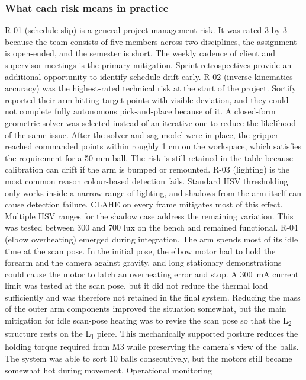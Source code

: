 \subsubsection*{What each risk means in practice}
R-01 (schedule slip) is a general project-management risk. It was rated
3 by 3 because the team consists of five members across two disciplines,
the assignment is open-ended, and the semester is short. The weekly
cadence of client and supervisor meetings is the primary mitigation.
Sprint retrospectives provide an additional opportunity to identify
schedule drift early.
R-02 (inverse kinematics accuracy) was the highest-rated technical
risk at the start of the project. Sortify \cite{sortify} reported their
arm hitting target points with visible deviation, and they could not
complete fully autonomous pick-and-place because of it. A closed-form
geometric solver was selected instead of an iterative one to reduce the
likelihood of the same issue. After the solver and sag model were in
place, the gripper reached commanded points within roughly 1 cm on the
workspace, which satisfies the requirement for a 50 mm ball. The risk is
still retained in the table because calibration can drift if the arm is
bumped or remounted.
R-03 (lighting) is the most common reason colour-based detection
fails. Standard HSV thresholding only works inside a narrow range of
lighting, and shadows from the arm itself can cause detection failure.
CLAHE on every frame mitigates most of this effect. Multiple HSV ranges
for the shadow case address the remaining variation. This was tested
between 300 and 700 lux on the bench and remained functional.
R-04 (elbow overheating) emerged during integration. The arm spends most
of its idle time at the scan pose. In the initial pose, the elbow motor
had to hold the forearm and the camera against gravity, and long
stationary demonstrations could cause the motor to latch an overheating
error and stop. A 300~mA current limit was tested at the scan pose, but
it did not reduce the thermal load sufficiently and was therefore not
retained in the final system.
Reducing the mass of the outer arm components improved the situation
somewhat, but the main mitigation for idle scan-pose heating was to
revise the scan pose so that the L\textsubscript{2} structure rests on
the L\textsubscript{1} piece. This mechanically supported posture reduces
the holding torque required from M3 while preserving the camera's view of
the balls. The system was able to sort 10 balls consecutively, but the
motors still became somewhat hot during movement. Operational monitoring
